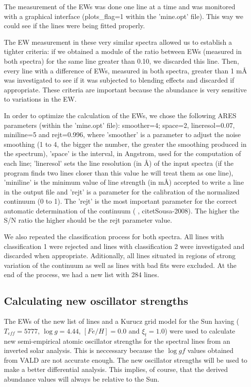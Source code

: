 \documentclass[dvips,12pt,a4paper]{report}
\begin{document}
{The measurement of the EWs was done one line at a time and was monitored with a graphical interface (plots\_flag=1 within the 'mine.opt' file). This way we could see if the lines were being fitted properly.

The EW measurement in these very similar spectra allowed us to establish a tighter criteria: if we obtained a module of the ratio between EWs (measured in both spectra) for the same line greater than 0.10, we  discarded this line. Then, every line with a difference of EWs, measured in both spectra, greater than 1 m\AA{} was investigated to see if it was subjected to blending effects and discarded if appropriate. These criteria are important because the abundance is very sensitive to variations in the EW. %

In order to optimize the calculation of the EWs, we chose the following ARES parameters (within the 'mine.opt' file): smoother=4; space=2, lineresol=0.07, miniline=5 and rejt=0.996, where 'smoother' is a parameter to adjust the noise smoothing (1 to 4, the bigger the number, the greater the smoothing produced in the spectrum), 'space' is the interval, in Angstrom, used for the computation of each line; 'lineresol' sets the line resolution (in \AA) of the input spectra (if the program finds two lines closer than this value he will treat them as one line),  'miniline' is the minimum value of line strength (in m\AA{}) accepted to write a line in the output file and 'rejt' is a parameter for the calibration of the normalized continuum (0 to 1). The 'rejt' is the most important parameter for the correct automatic determination of the continuum (\citeauthor{Sousa-2007} \citeyear{Sousa-2007}, citet{Sousa-2008}). The higher the S/N ratio the higher should be the rejt parameter value.

We also repeated the classification process for both spectra. All lines with classification 1 were rejected and lines with classification 2 were investigated and discarded when appropriate. Aditionally, all lines situated in regions of strong variation of the continuum as well as lines with bad fits were excluded. At the end of the process, we had a new list with 284 lines. 

\subsection {Calculating new oscillator strengths}
\label{newloggf}
The EWs of the new list of lines and a Kurucz grid model for the Sun \citep{Kurucz-1993} having ($T_{eff}=5777$, $\log g=4.44$, $[Fe/H]=0.0$ and $\xi_t=1.0$) were used to calculate new semi-empirical atomic oscillator strengths for the spectral lines from an inverted solar analysis. This is neccessary because the $\log gf$ values obtained from VALD are not accurate enough. The new oscillator strengths will be used to make a better differential analysis. This implies, of course, that the derived abundance values will always be relative to the Sun.

}
\end{document}
